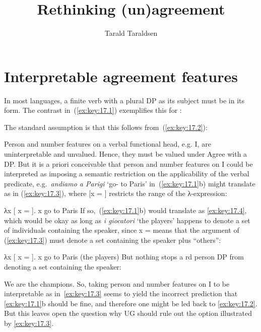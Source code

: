 \documentclass[output=paper]{langsci/langscibook}
\author{Tarald Taraldsen}
\title{Rethinking (un)agreement}
\begin{document}
\glsresetall
\maketitle

\section{Interpretable agreement features}\label{sec:key:17.1}

In most languages, a finite verb with a plural DP as its subject must be in its
\Tpl{} form. The contrast in~(\ref{ex:key:17.1}) exemplifies this for :

\ea\label{ex:key:17.1} 
    \ea[]{%
    \gll I giocatori vanno a Parigi.\\
        the players go-\Tpl{} to Paris\\
    \glt}
    \z
\z
The standard assumption is that this follows from~(\ref{ex:key:17.2}):

\ea\label{ex:key:17.2}
    \ea Person and number features on a verbal functional head, e.g. I, are
    uninterpretable and unvalued.
    \ex Hence, they must be valued under Agree with a DP.
    \z
\z
But it is a priori conceivable that person and number features on I could be
interpreted as imposing a semantic restriction on the applicability of the
verbal predicate, e.g.\ \emph{andiamo a Parigi} ‘go-\Fpl{} to Paris’
in~(\ref{ex:key:17.1}b) might translate as in (\ref{ex:key:17.3}), where [x = \Fpl{}]
restricts the range of the λ-expression:

\ea\label{ex:key:17.3}
    λx [ x = \Fpl{}]. x go to Paris
\z
If so,~(\ref{ex:key:17.1}b) would translate as \eqref{ex:key:17.4}, which would be okay as long as
\emph{i giocatori} ‘the players’ happens to denote a set of individuals
containing the speaker, since x = \Fpl{} means that the argument of
(\ref{ex:key:17.3}) must denote a set containing the speaker plus “others”:

\ea\label{ex:key:17.4}
    λx [ x = \Fpl{}]. x go to Paris (the players)
\z
But nothing stops a \Third{}rd person DP from denoting a set containing the
speaker:

\ea\label{ex:key:17.5}
    We are the champions.
\z
So, taking person and number features on I to be interpretable as
in~\eqref{ex:key:17.3} seems to yield the incorrect prediction that \eqref{ex:key:17.1}b should be
fine, and therefore one might be led back to \eqref{ex:key:17.2}. But this leaves open the
question why UG should rule out the option illustrated by \eqref{ex:key:17.3}.
\end{document}
